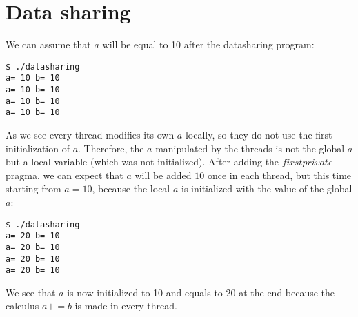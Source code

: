 \chapter{Data sharing}

We can assume that $a$ will be equal to 10 after the datasharing program:
\begin{verbatim}
$ ./datasharing 
a= 10 b= 10
a= 10 b= 10
a= 10 b= 10
a= 10 b= 10
\end{verbatim}

As we see every thread modifies its own $a$ locally, so they do not use the first initialization of $a$. Therefore, the $a$ manipulated by the threads is not the global $a$ but a local variable (which was not initialized). 
After adding the $firstprivate$ pragma, we can expect that $a$ will be added $10$ once in each thread, but this time starting from $a = 10$, because the local $a$ is initialized with the value of the global $a$:

\begin{verbatim}
$ ./datasharing 
a= 20 b= 10
a= 20 b= 10
a= 20 b= 10
a= 20 b= 10
\end{verbatim}

We see that $a$ is now initialized to 10 and equals to $20$ at the end because the calculus $a += b$ is made in every thread.
